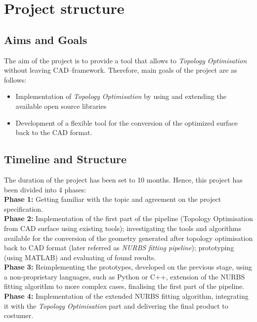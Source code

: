 \section{Project structure}
\subsection{Aims and Goals}
The aim of the project is to provide a tool that allows to \textit{Topology Optimisation} without leaving CAD--framework. Therefore, main goals of the project are as follows:
\begin{itemize}
\item Implementation of \textit{Topology Optimisation} by using and extending the available open source libraries
\item Development of a flexible tool for the conversion of the optimized surface back to the CAD format.
\end{itemize}
\subsection{Timeline and Structure}
The duration of the project has been set to 10 months. Hence, this project has been divided into 4 phases:\\

\textbf{Phase 1:} Getting familiar with the topic and agreement on the project specification.\\

\textbf{Phase 2:} Implementation of the first part of the pipeline (Topology Optimisation from CAD surface using existing tools); investigating the tools and algorithms available for the conversion of the geometry generated after topology optimisation back to CAD format (later referred as \textit{NURBS fitting pipeline}); prototyping (using MATLAB) and evaluating of found results.\\

\textbf{Phase 3:} Reimplementing the prototypes, developed on the previous stage, using a non-proprietary languages, such as Python or C++, extension of the NURBS fitting algorithm to more complex cases, finalising the first part of the pipeline.\\

\textbf{Phase 4:} Implementation of the extended NURBS fitting algorithm, integrating it with the \textit{Topology Optimisation} part and delivering the final product to costumer.

